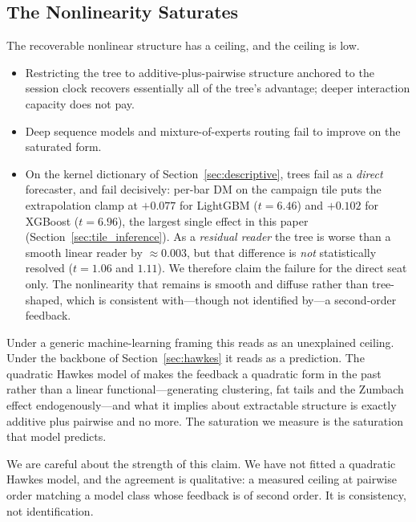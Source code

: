 \subsection{The Nonlinearity Saturates}
\label{sec:saturation}

The recoverable nonlinear structure has a ceiling, and the ceiling is low.

\begin{itemize}
  \item Restricting the tree to additive-plus-pairwise structure anchored to
    the session clock recovers essentially all of the tree's advantage;
    deeper interaction capacity does not pay.
  \item Deep sequence models and mixture-of-experts routing fail to improve on
    the saturated form.
  \item On the kernel dictionary of Section~\ref{sec:descriptive}, trees fail
    as a \emph{direct} forecaster, and fail decisively: per-bar DM on the
    campaign tile puts the extrapolation clamp at $+0.077$ for LightGBM
    ($t = 6.46$) and $+0.102$ for XGBoost ($t = 6.96$), the largest single
    effect in this paper (Section~\ref{sec:tile_inference}). As a
    \emph{residual reader} the tree is worse than a smooth linear reader by
    $\approx 0.003$, but that difference is \emph{not} statistically resolved
    ($t = 1.06$ and $1.11$). We therefore claim the failure for the direct seat
    only. The nonlinearity that remains is smooth and diffuse rather than
    tree-shaped, which is consistent with---though not identified by---a
    second-order feedback.
\end{itemize}

Under a generic machine-learning framing this reads as an unexplained ceiling.
Under the backbone of Section~\ref{sec:hawkes} it reads as a prediction. The
quadratic Hawkes model of \citet{BlancDonierBouchaud2017} makes the feedback a
quadratic form in the past rather than a linear functional---generating
clustering, fat tails and the Zumbach effect endogenously---and what it implies
about extractable structure is exactly additive plus pairwise and no more. The
saturation we measure is the saturation that model predicts.

We are careful about the strength of this claim. We have not fitted a quadratic
Hawkes model, and the agreement is qualitative: a measured ceiling at pairwise
order matching a model class whose feedback is of second order. It is
consistency, not identification. 

